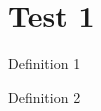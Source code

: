 \chapter{Test 1}\label{chap:test1}

\begin{definition}\label{def:def1}
    \leanok
    Definition 1
\end{definition}

\begin{definition}\label{def:def2}
    Definition 2
\end{definition}